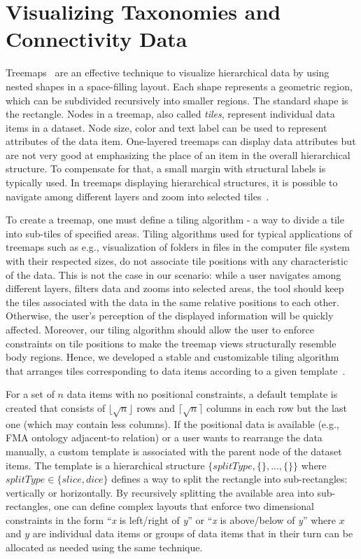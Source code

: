 \section{Visualizing Taxonomies and Connectivity Data} \label{sect:visualization}        %

Treemaps~\cite{JS91} are an effective technique to visualize hierarchical data by using nested shapes in a space-filling layout.
Each shape represents a geometric region, which can be subdivided recursively into smaller regions. The standard shape is the rectangle.
Nodes in a treemap, also called \emph{tiles}, represent individual data items in a dataset. Node size, color and text label can be used to represent attributes of the data item. One-layered treemaps can display data attributes but are not very good at emphasizing the place of an item in the overall hierarchical structure. To compensate for that, a small margin with structural labels is typically used. In treemaps displaying hierarchical structures, it is possible to navigate among different layers and zoom into selected tiles~\cite{BL07}.

To create a treemap, one must define a tiling algorithm - a way to divide a tile into sub-tiles of specified areas.
Tiling algorithms used for typical applications of treemaps such as e.g., visualization of folders in files in the computer file system with their respected sizes, do not associate tile positions with any characteristic of the data. This is not the case in our scenario: while a user navigates among different layers, filters data and zooms into selected areas, the tool should keep the tiles associated with the data in the same relative positions to each other. Otherwise, the user's perception of the displayed information will be quickly affected. Moreover, our tiling algorithm should allow the user to enforce constraints on tile positions to make the treemap views structurally resemble body regions. Hence, we developed a stable and customizable tiling algorithm that arranges tiles corresponding to data items according to a given template~\cite{KBK14}.

For a set of $n$ data items with no positional constraints, a default template is created that consists of $\lfloor \sqrt{n} \rfloor$ rows and $\lceil \sqrt{n} \rceil$ columns in each row but the last one (which may contain less columns). If the positional data is available (e.g., FMA ontology adjacent-to relation) or a user wants to rearrange the data manually, a custom template is associated with the parent node of the dataset items. The template is a hierarchical structure
$\{splitType, \{\},..., \{\}\}$ where $splitType \in \{slice, dice\}$ defines a way to split the rectangle into sub-rectangles: vertically or horizontally. By recursively splitting the available area into sub-rectangles, one can define complex layouts that enforce two dimensional constraints in the form ``\emph{x} is left/right of \emph{y}'' or ``\emph{x} is above/below of \emph{y}'' where $x$ and $y$ are individual data items or groups of data items that in their turn can be allocated as needed using the same technique.

